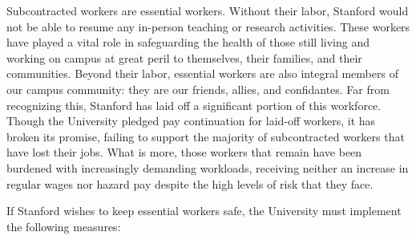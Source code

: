 \documentclass[12pt, titlepage, letterpaper]{article}
\begin{document}
Subcontracted workers are essential workers. Without their labor, Stanford would not be able to resume any in-person teaching or research activities. These workers have played a vital role in safeguarding the health of those still living and working on campus at great peril to themselves, their families, and their communities. Beyond their labor, essential workers are also integral members of our campus community: they are our friends, allies, and confidantes. Far from recognizing this, Stanford has laid off a significant portion of this workforce. Though the University pledged pay continuation for laid-off workers, it has broken its promise, failing to support the majority of subcontracted workers that have lost their jobs. What is more, those workers that remain have been burdened with increasingly demanding workloads, receiving neither an increase in regular wages nor hazard pay despite the high levels of risk that they face. 

If Stanford wishes to keep essential workers safe, the University must implement the following measures:

\end{document}
